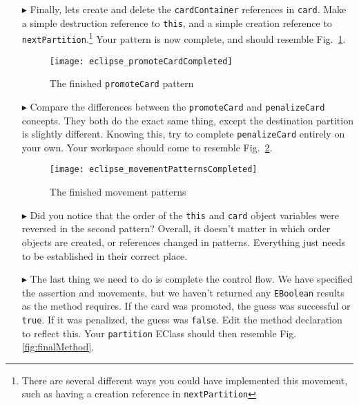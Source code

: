 \begin{itemize}
\item[$\blacktriangleright$] Finally, lets create and delete the \texttt{cardContainer} references in \texttt{card}. Make a simple destruction reference to
\texttt{this}, and a simple creation reference to \texttt{nextPartition}.\footnote{There are several different ways you could have implemented this movement, such as having a
creation reference in \texttt{nextPartition}} Your pattern is now complete, and should resemble Fig.~\ref{fig:completedPromote}.

\begin{figure}[htbp]
\begin{center}
  \texttt{[image: eclipse\_promoteCardCompleted]}
  \caption{The finished \texttt{promoteCard} pattern}
  \label{fig:completedPromote}
\end{center}
\end{figure} 

\item[$\blacktriangleright$] Compare the differences between the \texttt{promoteCard} and \texttt{penalizeCard} concepts. They both do the exact same thing,
except the destination partition is slightly different. Knowing this, try to complete \texttt{penalizeCard} entirely on your own. Your workspace should come to
resemble Fig.~\ref{fig:completedPatterns}.

\begin{figure}[htbp]
\begin{center}
  \texttt{[image: eclipse\_movementPatternsCompleted]}
  \caption{The finished movement patterns}
  \label{fig:completedPatterns}
\end{center}
\end{figure}


\item[$\blacktriangleright$] Did you notice that the order of the \texttt{this} and \texttt{card} object variables were reversed in the second pattern?
Overall, it doesn't matter in which order objects are created, or references changed in patterns. Everything just needs to be established in their correct
place.

\item[$\blacktriangleright$] The last thing we need to do is complete the control flow. We have specified the assertion and movements, but we haven't
returned any \texttt{EBoolean} results as the method requires. If the card was promoted, the guess was successful or \texttt{true}. If it was penalized, the
guess was \texttt{false}. Edit the method declaration to reflect this. Your \texttt{partition} EClass should then resemble Fig.\ref{fig:finalMethod}.


\end{itemize}
